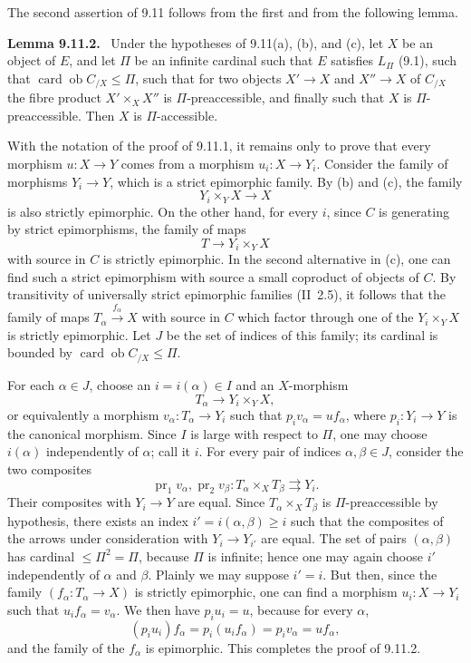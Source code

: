 \documentclass[11pt]{article}
\newcommand{\ob}{\operatorname{ob}}
\newcommand{\card}{\operatorname{card}}
\newenvironment{statement}[1]{\par\medskip\noindent\textbf{#1.}\ }{\par\medskip}
\begin{document}
The second assertion of 9.11 follows from the first and from the following lemma.

\begin{statement}{Lemma 9.11.2}
Under the hypotheses of 9.11(a), (b), and (c), let $X$ be an object of $E$, and let $\Pi$ be an infinite cardinal such that $E$ satisfies $L_\Pi$ (9.1), such that $\card\ob C_{/X}\leq\Pi$, such that for two objects $X'\to X$ and $X''\to X$ of $C_{/X}$ the fibre product $X'\times_X X''$ is $\Pi$-preaccessible, and finally such that $X$ is $\Pi$-preaccessible. Then $X$ is $\Pi$-accessible.
\end{statement}

With the notation of the proof of 9.11.1, it remains only to prove that every morphism $u:X\to Y$ comes from a morphism $u_i:X\to Y_i$. Consider the family of morphisms $Y_i\to Y$, which is a strict epimorphic family. By (b) and (c), the family
\[
 Y_i\times_Y X\longrightarrow X
\]
is also strictly epimorphic. On the other hand, for every $i$, since $C$ is generating by strict epimorphisms, the family of maps
\[
 T\longrightarrow Y_i\times_Y X
\]
with source in $C$ is strictly epimorphic. In the second alternative in (c), one can find such a strict epimorphism with source a small coproduct of objects of $C$. By transitivity of universally strict epimorphic families (II~2.5), it follows that the family of maps $T_\alpha\xrightarrow{f_\alpha}X$ with source in $C$ which factor through one of the $Y_i\times_Y X$ is strictly epimorphic. Let $J$ be the set of indices of this family; its cardinal is bounded by $\card\ob C_{/X}\leq\Pi$.

For each $\alpha\in J$, choose an $i=i(\alpha)\in I$ and an $X$-morphism
\[
 T_\alpha\longrightarrow Y_i\times_Y X,
\]
or equivalently a morphism $v_\alpha:T_\alpha\to Y_i$ such that $p_i v_\alpha=uf_\alpha$, where $p_i:Y_i\to Y$ is the canonical morphism. Since $I$ is large with respect to $\Pi$, one may choose $i(\alpha)$ independently of $\alpha$; call it $i$. For every pair of indices $\alpha,\beta\in J$, consider the two composites
\[
 \operatorname{pr}_1v_\alpha,
 \operatorname{pr}_2v_\beta:
 T_\alpha\times_XT_\beta\rightrightarrows Y_i .
\]
Their composites with $Y_i\to Y$ are equal. Since $T_\alpha\times_XT_\beta$ is $\Pi$-preaccessible by hypothesis, there exists an index $i'=i(\alpha,\beta)\geq i$ such that the composites of the arrows under consideration with $Y_i\to Y_{i'}$ are equal. The set of pairs $(\alpha,\beta)$ has cardinal $\leq\Pi^2=\Pi$, because $\Pi$ is infinite; hence one may again choose $i'$ independently of $\alpha$ and $\beta$. Plainly we may suppose $i'=i$. But then, since the family $(f_\alpha:T_\alpha\to X)$ is strictly epimorphic, one can find a morphism $u_i:X\to Y_i$ such that $u_if_\alpha=v_\alpha$. We then have $p_iu_i=u$, because for every $\alpha$,
\[
 (p_iu_i)f_\alpha=p_i(u_if_\alpha)=p_iv_\alpha=uf_\alpha,
\]
and the family of the $f_\alpha$ is epimorphic. This completes the proof of 9.11.2.
\end{document}
